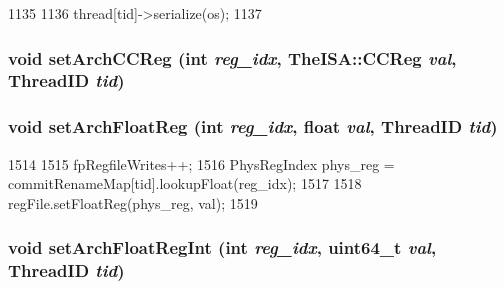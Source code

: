 \begin{DoxyCode}
1135 {
1136     thread[tid]->serialize(os);
1137 }
\end{DoxyCode}
\hypertarget{classFullO3CPU_aae7106b0574d000f60ebacc2f938fe62}{
\subsubsection[{setArchCCReg}]{\setlength{\rightskip}{0pt plus 5cm}void setArchCCReg (int {\em reg\_\-idx}, \/  TheISA::CCReg {\em val}, \/  {\bf ThreadID} {\em tid})}}
\label{classFullO3CPU_aae7106b0574d000f60ebacc2f938fe62}
\hypertarget{classFullO3CPU_ac527b87a643907df19ca5f4600200382}{
\subsubsection[{setArchFloatReg}]{\setlength{\rightskip}{0pt plus 5cm}void setArchFloatReg (int {\em reg\_\-idx}, \/  float {\em val}, \/  {\bf ThreadID} {\em tid})}}
\label{classFullO3CPU_ac527b87a643907df19ca5f4600200382}



\begin{DoxyCode}
1514 {
1515     fpRegfileWrites++;
1516     PhysRegIndex phys_reg = commitRenameMap[tid].lookupFloat(reg_idx);
1517 
1518     regFile.setFloatReg(phys_reg, val);
1519 }
\end{DoxyCode}
\hypertarget{classFullO3CPU_a1295e65a7841d7e83a5f3a3c44770c8f}{
\subsubsection[{setArchFloatRegInt}]{\setlength{\rightskip}{0pt plus 5cm}void setArchFloatRegInt (int {\em reg\_\-idx}, \/  uint64\_\-t {\em val}, \/  {\bf ThreadID} {\em tid})}}
\label{classFullO3CPU_a1295e65a7841d7e83a5f3a3c44770c8f}



